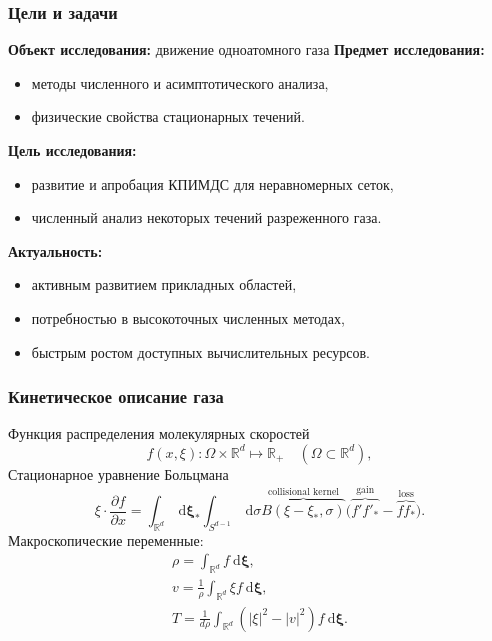\documentclass[mathserif]{beamer} %
\title{\thesisTitle}
\author{%
    \emph{соискатель}:~\thesisAuthor\\ %
    \emph{руководитель}:~\supervisorRegaliaShort~\supervisorFio %
}
\institute{%
    \thesisOrganization %
}
\date{}
\newcommand{\dd}{\:\mathrm{d}}
\newcommand{\pder}[2][]{\frac{\partial#1}{\partial#2}}
\newcommand{\dxi}{\boldsymbol{\dd\xi}}
\begin{document}
\frame{\titlepage}

\begin{frame}
    \frametitle{Цели и задачи}
    \textbf{Объект исследования:} движение одноатомного газа
    \textbf{Предмет исследования:}
    \begin{itemize}
        \item методы численного и асимптотического анализа,
        \item физические свойства стационарных течений.
    \end{itemize}
    \textbf{Цель исследования:}
    \begin{itemize}
        \item развитие и апробация КПИМДС для неравномерных сеток,
        \item численный анализ некоторых течений разреженного газа.
    \end{itemize}
    \textbf{Актуальность:}
    \begin{itemize}
        \item активным развитием прикладных областей,
        \item потребностью в высокоточных численных методах,
        \item быстрым ростом доступных вычислительных ресурсов.
    \end{itemize}
\end{frame}

\begin{frame}
    \frametitle{Кинетическое описание газа}
    Функция распределения молекулярных скоростей
    \begin{equation}
        f(x,\xi): \Omega\times\mathbb{R}^d\mapsto\mathbb{R}_+
        \quad (\Omega\subset\mathbb{R}^d),
    \end{equation}
    Стационарное уравнение Больцмана
    \begin{equation}
        \xi\cdot\pder[f]{x} = \int_{\mathbb{R}^d}\dxi_* \int_{S^{d-1}} \dd\sigma
        \overbrace{B(\xi-\xi_*,\sigma)}^\text{collisional kernel}
        \Big( \overbrace{f'f'_*}^\text{gain} - \overbrace{ff_*}^\text{loss} \Big).
    \end{equation}
    Макроскопические переменные:
    \begin{gather*}
        \rho = \int_{\mathbb{R}^d} f\dxi, \\
        v = \frac1\rho\int_{\mathbb{R}^d} \xi f\dxi, \\
        T = \frac1{d\rho}\int_{\mathbb{R}^d} \left(|\xi|^2 - |v|^2\right) f\dxi.
    \end{gather*}
\end{frame}
\end{document}

